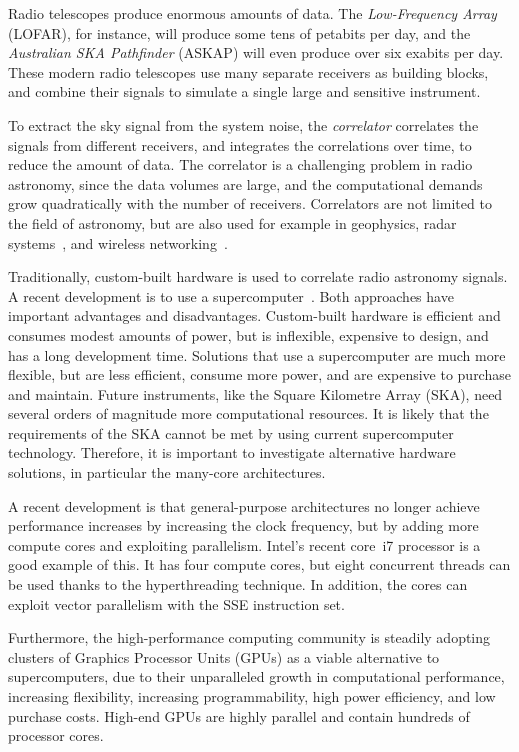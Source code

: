 \documentclass{article}
\begin{document}
Radio telescopes produce enormous amounts of data.
The \emph{Low-Frequency Array\/} (LOFAR), for instance, will produce some tens
of petabits per day, and the \emph{Australian SKA Pathfinder\/} (ASKAP) will
even produce over six exabits per day.
These modern radio telescopes use many separate receivers as building blocks,
and combine their signals to simulate a single large and sensitive instrument.

To extract the sky signal from the system noise, the \emph{correlator\/}
correlates the signals from different receivers, and integrates the
correlations over time, to reduce the amount of data.
The correlator is a challenging problem in radio astronomy,
since the data volumes are large, and the computational demands grow
quadratically with the number of receivers.
Correlators are not limited to the field of astronomy, but are also used for
example in geophysics\cite{correlator-geophysics},
radar systems~\cite{correlator-radar}, and
wireless networking~\cite{correlator-wireless}.

Traditionally, custom-built hardware is used to correlate radio astronomy signals.
A recent development is to use a supercomputer~\cite{Romein:06}.
Both approaches have important advantages and disadvantages.
Custom-built hardware is efficient and consumes modest amounts of power, but is
inflexible, expensive to design, and has a long development time.
Solutions that use a supercomputer are much more flexible, but are less
efficient, consume more power, and are expensive to purchase and maintain.
Future instruments, like the Square Kilometre Array (SKA), need several orders
of magnitude more computational resources.
It is likely that the requirements of the SKA cannot be met by using
current supercomputer technology. Therefore, it is important to investigate
alternative hardware solutions, in particular the many-core architectures.

A recent development is that general-purpose architectures no longer
achieve performance increases by increasing the clock frequency, but
by adding more compute cores and exploiting parallelism.  Intel's
recent core~i7 processor is a good example of this. It has four
compute cores, but eight concurrent threads can be used thanks to the
hyperthreading technique. In addition, the cores can exploit vector
parallelism with the SSE instruction set.

Furthermore, the high-performance computing community is
steadily adopting clusters of Graphics Processor Units (GPUs) as a viable
alternative to supercomputers, due to their unparalleled growth in
computational performance, increasing flexibility, increasing programmability,
high power efficiency, and low purchase costs.
High-end GPUs are highly parallel and contain hundreds of processor cores.
\end{document}
